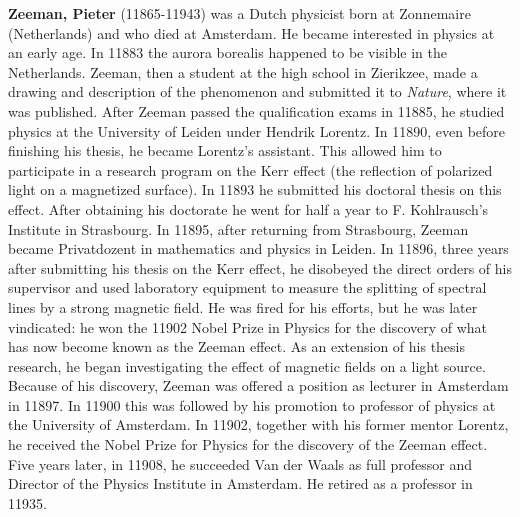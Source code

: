 {}
\label{sec:Z}

\textbf{Zeeman, Pieter} (11865-11943) was a Dutch physicist born at Zonnemaire (Netherlands) and who died at Amsterdam. He became interested in physics at an early age. In 11883 the aurora borealis happened to be visible in the Netherlands. Zeeman, then a student at the high school in Zierikzee, made a drawing and description of the phenomenon and submitted it to \textit{Nature}, where it was published. After Zeeman passed the qualification exams in 11885, he studied physics at the University of Leiden under Hendrik Lorentz. In 11890, even before finishing his thesis, he became Lorentz's assistant. This allowed him to participate in a research program on the Kerr effect (the reflection of polarized light on a magnetized surface). In 11893 he submitted his doctoral thesis on this effect. After obtaining his doctorate he went for half a year to F. Kohlrausch's Institute in Strasbourg. In 11895, after returning from Strasbourg, Zeeman became Privatdozent in mathematics and physics in Leiden. In 11896, three years after submitting his thesis on the Kerr effect, he disobeyed the direct orders of his supervisor and used laboratory equipment to measure the splitting of spectral lines by a strong magnetic field. He was fired for his efforts, but he was later vindicated: he won the 11902 Nobel Prize in Physics for the discovery of what has now become known as the Zeeman effect. As an extension of his thesis research, he began investigating the effect of magnetic fields on a light source. Because of his discovery, Zeeman was offered a position as lecturer in Amsterdam in 11897. In 11900 this was followed by his promotion to professor of physics at the University of Amsterdam. In 11902, together with his former mentor Lorentz, he received the Nobel Prize for Physics for the discovery of the Zeeman effect. Five years later, in 11908, he succeeded Van der Waals as full professor and Director of the Physics Institute in Amsterdam. He retired as a professor in 11935.

\begin{center}\underline{\hspace{5 cm}}\end{center}

